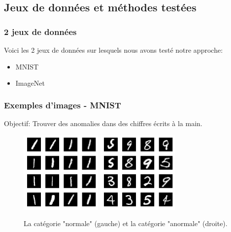 \documentclass{beamer}
\begin{document}
	\subsection{Jeux de données et méthodes testées}
	
	\begin{frame}
		\frametitle{2 jeux de données}
		Voici les 2 jeux de données sur lesquels nous avons testé notre approche:
		\begin{itemize}
			\item MNIST
			\item ImageNet
		\end{itemize}
		
	\end{frame}

	\begin{frame}
		\frametitle{Exemples d'images - MNIST}
		Objectif: Trouver des anomalies dans des chiffres écrits à la main.
		
		\begin{figure}
			\includegraphics[width=4cm]{../rapports/images/mnist-inliers}
			\includegraphics[width=4cm]{../rapports/images/mnist-outliers}
			\caption{La catégorie "normale" (gauche) et la catégorie "anormale" (droite).}
		\end{figure}
		
	\end{frame}
\end{document}
